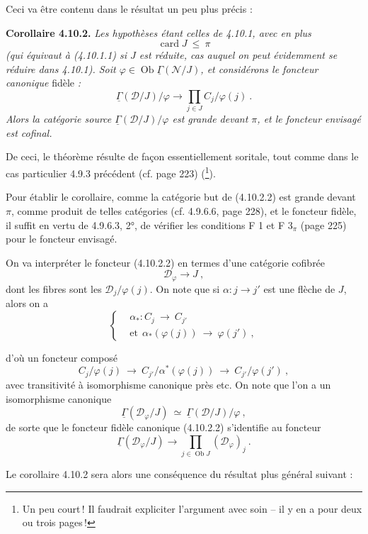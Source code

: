 \documentclass[11pt]{article}
\newcommand{\printedpage}[1]{\marginpar{\footnotesize p.~#1}}
\newcommand{\msp}[1]{\marginpar{\footnotesize [#1]}}
\newcommand{\Ob}{\operatorname{Ob}}
\newcommand{\card}{\operatorname{card}}
\newcommand{\uGamma}{\underline{\Gamma}}
\begin{document}
Ceci va être contenu dans le résultat un peu plus précis :

\textbf{Corollaire 4.10.2.} \textit{Les hypothèses étant celles de 4.10.1, avec en plus}
\[
\card J \ \leqslant \ \pi \tag*{(4.10.2.1)}
\]
\textit{(qui équivaut à (4.10.1.1) si $J$ est réduite, cas auquel on peut évidemment se réduire dans 4.10.1). Soit $\varphi \in \Ob \uGamma(\mathcal{N}/J)$, et considérons le foncteur canonique} fidèle \textit{:}
\[
\uGamma(\mathcal{D}/J)/\varphi \longrightarrow \prod_{j\in J} C_j/\varphi(j) \ . \tag*{(4.10.2.2)}
\]
\textit{Alors la catégorie source $\uGamma(\mathcal{D}/J)/\varphi$ est grande devant $\pi$, et le foncteur envisagé est cofinal.}

\msp{page 246}
De ceci, le théorème résulte de façon essentiellement soritale, tout comme dans le cas particulier 4.9.3 précédent (cf. page 223) (\footnote{Un peu court\,! Il faudrait expliciter l'argument avec soin – il y en a pour deux ou trois pages\,!}).

Pour établir le corollaire, comme la catégorie but de (4.10.2.2) est grande devant $\pi$, comme produit de telles catégories (cf. 4.9.6.6, page 228), et le foncteur fidèle, il suffit en vertu de 4.9.6.3, 2°, de vérifier les conditions F 1 et F 3$_\pi$ (page 225) pour le foncteur envisagé.

On va interpréter le foncteur (4.10.2.2) en termes d'une catégorie cofibrée
\[
\mathcal{D}_\varphi \longrightarrow J \ , \tag*{(4.10.5)}
\]
dont les fibres sont les $\mathcal{D}_j/\varphi(j)$. On note que si $\alpha : j \longrightarrow j'$ est une flèche de $J$, alors on a
\[
\left\{
\begin{aligned}
&\alpha_* : C_j \ \longrightarrow \ C_{j'} \\
&\text{et} \ \ \alpha_*(\varphi(j)) \ \longrightarrow \ \varphi(j') \ ,
\end{aligned}
\right.
\]

\printedpage{93}

\msp{page 247}
d'où un foncteur composé
\[
C_j/\varphi(j) \ \longrightarrow \ C_{j'}/\alpha^*(\varphi(j)) \ \longrightarrow \ C_{j'}/\varphi(j') \ ,
\]
avec transitivité à isomorphisme canonique près etc. On note que l'on a un isomorphisme canonique
\[
\uGamma(\mathcal{D}_\varphi/J) \ \simeq \ \uGamma(\mathcal{D}/J)/\varphi \ ,
\]
de sorte que le foncteur fidèle canonique (4.10.2.2) s'identifie au foncteur
\[
\uGamma(\mathcal{D}_\varphi/J) \longrightarrow \prod_{j\in\Ob J} (\mathcal{D}_\varphi)_j \ . \tag*{(4.10.6)}
\]

Le corollaire 4.10.2 sera alors une conséquence du résultat plus général suivant :
\end{document}
